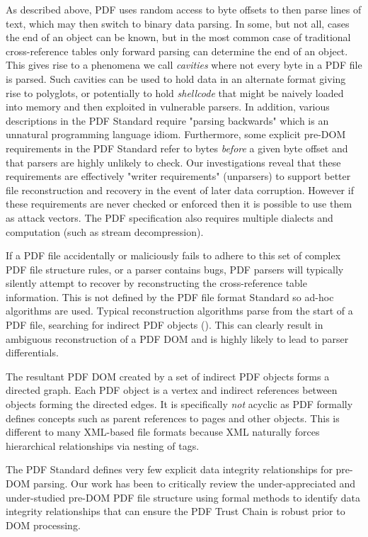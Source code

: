 As described above, PDF uses random access to byte offsets to then parse lines of text,
which may then switch to binary data parsing. 
In some, but not all, cases the end of an object can be known, but in the most common case 
of traditional cross-reference tables only forward parsing can determine the end of an object. 
This gives rise to a phenomena we call \emph{cavities} where not every byte in a PDF file is parsed.
Such cavities can be used to hold data in an alternate format giving rise to polyglots, or potentially
to hold \emph{shellcode} that might be naively loaded into memory and then exploited 
in vulnerable parsers.
In addition, various descriptions in the PDF Standard require "parsing backwards" which is 
an unnatural programming language idiom. Furthermore, some explicit pre-DOM requirements
in the PDF Standard
refer to bytes \emph{before} a given byte offset and that parsers are highly unlikely to check. 
Our investigations reveal that these requirements are effectively "writer requirements" (unparsers) to
support better file reconstruction and recovery in the event of later data corruption. 
However if these requirements are never checked or enforced then it is possible to use them as attack
vectors.  
The PDF specification also requires multiple
dialects and computation (such as stream decompression).

If a PDF file accidentally or maliciously fails to adhere to this set of complex PDF file structure
rules, or a parser contains bugs, PDF parsers will typically silently attempt to recover
by reconstructing the cross-reference table information. 
This is not defined by the PDF file format Standard so 
ad-hoc algorithms are used. Typical reconstruction algorithms parse from the start of a PDF 
file, searching for indirect PDF objects (). This can clearly result
in ambiguous reconstruction of a PDF DOM and is highly likely to lead to parser differentials.

The resultant PDF DOM created by a set of indirect PDF objects forms a directed graph. 
Each PDF object is a vertex and indirect references between objects forming the directed edges. It is 
specifically \emph{not} acyclic as PDF formally defines concepts such as parent references to 
pages and other objects. This is different to many XML-based file formats because XML naturally forces hierarchical relationships via nesting of tags.

The PDF Standard defines very few explicit data integrity relationships for pre-DOM parsing. 
Our work has been to critically review the under-appreciated and under-studied pre-DOM PDF
file structure using formal methods to identify data integrity relationships that can 
ensure the PDF Trust Chain is robust prior to DOM processing.

